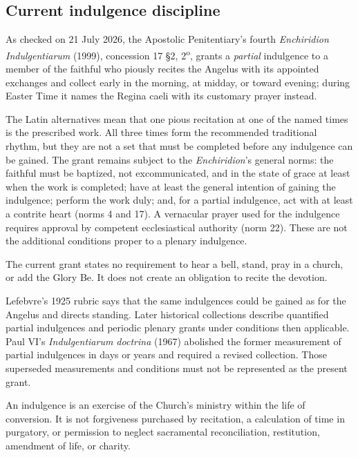 \subsection{Current indulgence discipline}

As checked on 21 July 2026, the Apostolic Penitentiary's fourth \textit{Enchiridion Indulgentiarum} (1999), concession 17 \S2, 2\textsuperscript{o}, grants a \emph{partial} indulgence to a member of the faithful who piously recites the Angelus with its appointed exchanges and collect early in the morning, at midday, or toward evening; during Easter Time it names the Regina caeli with its customary prayer instead.

The Latin alternatives mean that one pious recitation at one of the named times is the prescribed work. All three times form the recommended traditional rhythm, but they are not a set that must be completed before any indulgence can be gained. The grant remains subject to the \textit{Enchiridion}'s general norms: the faithful must be baptized, not excommunicated, and in the state of grace at least when the work is completed; have at least the general intention of gaining the indulgence; perform the work duly; and, for a partial indulgence, act with at least a contrite heart (norms 4 and 17). A vernacular prayer used for the indulgence requires approval by competent ecclesiastical authority (norm 22). These are not the additional conditions proper to a plenary indulgence.

The current grant states no requirement to hear a bell, stand, pray in a church, or add the Glory Be. It does not create an obligation to recite the devotion.

Lefebvre's 1925 rubric says that the same indulgences could be gained as for the Angelus and directs standing. Later historical collections describe quantified partial indulgences and periodic plenary grants under conditions then applicable. Paul VI's \textit{Indulgentiarum doctrina} (1967) abolished the former measurement of partial indulgences in days or years and required a revised collection. Those superseded measurements and conditions must not be represented as the present grant.

An indulgence is an exercise of the Church's ministry within the life of conversion. It is not forgiveness purchased by recitation, a calculation of time in purgatory, or permission to neglect sacramental reconciliation, restitution, amendment of life, or charity.

